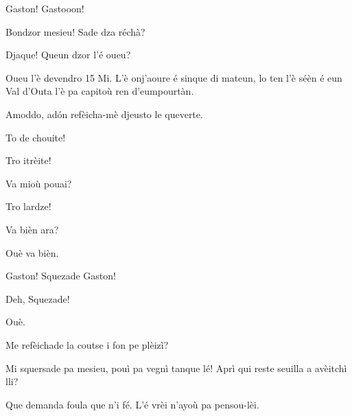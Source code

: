 \begin{drama}

\PersEmpourtantaspeaks Gaston! Gastooon!


\Eunfeurmispeaks Bondzor mesieu! Sade dza réchà?

\PersEmpourtantaspeaks Djaque!  Queun dzor l'é oueu? 

\Eunfeurmispeaks Oueu l'è devendro 15 Mi. L'è onj'aoure é sinque di mateun, lo ten l'è séèn é eun Val d'Outa l'è pa capitoù ren d'eumpourtàn.

\PersEmpourtantaspeaks Amoddo, ad\'on refèicha-mè djeusto le queverte.

\Eunfeurmispeaks To de chouite!


\PersEmpourtantaspeaks Tro itrèite! 

\Eunfeurmispeaks{} Va mioù pouai?

\PersEmpourtantaspeaks Tro lardze!


\Eunfeurmispeaks Va bièn ara?

\PersEmpourtantaspeaks Ouè va bièn.


\Casimirspeaks Gaston! Squezade Gaston! 


\Casimirspeaks Deh, Squezade! 

\Eunfeurmispeaks Ouè.

\Casimirspeaks Me refèichade la coutse i fon pe plèizì?

\Eunfeurmispeaks Mi squersade pa mesieu, pouì pa vegnì tanque lé! Aprì qui reste seuilla a avèitchì lli?

\Casimirspeaks Que demanda foula que n’i fé. L’é vrèi n’ayoù pa pensou-lèi.


\newpage
{}



\end{drama}
